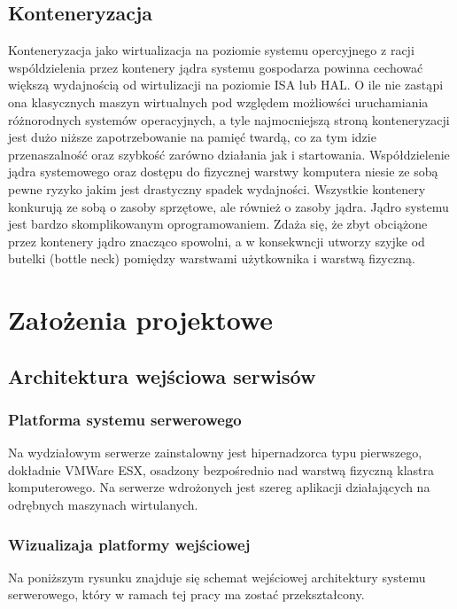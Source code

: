 \documentclass[polish, a4paper, 12pt, oneside]{book}
\begin{document}
\section{Konteneryzacja}
Konteneryzacja jako wirtualizacja na poziomie systemu opercyjnego z racji wspóldzielenia przez kontenery jądra systemu gospodarza powinna cechować większą wydajnością od wirtulizacji na poziomie ISA lub HAL. O ile nie zastąpi ona klasycznych maszyn wirtualnych pod względem możliowści uruchamiania różnorodnych systemów operacyjnych, a tyle najmocniejszą stroną konteneryzacji jest dużo niższe zapotrzebowanie na pamięć twardą, co za tym idzie przenaszalność oraz szybkość zarówno działania jak i startowania. Współdzielenie jądra systemowego oraz dostępu do fizycznej warstwy komputera niesie ze sobą pewne ryzyko jakim jest drastyczny spadek wydajności. Wszystkie kontenery konkurują ze sobą o zasoby sprzętowe, ale również o zasoby jądra. Jądro systemu jest bardzo skomplikowanym oprogramowaniem. Zdaża się, że zbyt obciążone przez kontenery jądro znacząco spowolni, a w konsekwncji utworzy szyjke od butelki (bottle neck) pomiędzy warstwami użytkownika i warstwą fizyczną.   


\chapter{Założenia projektowe}
\section{Architektura wejściowa serwisów}
\subsection{Platforma systemu serwerowego}
Na wydziałowym serwerze zainstalowny jest hipernadzorca typu pierwszego, dokładnie VMWare ESX, osadzony bezpośrednio nad warstwą fizyczną klastra komputerowego. Na serwerze wdrożonych jest szereg aplikacji działających na odrębnych maszynach wirtulanych. 

\subsection {Wizualizaja platformy wejściowej} Na poniższym rysunku znajduje się schemat wejściowej architektury systemu serwerowego, który w ramach tej pracy ma zostać przekształcony.
\end{document}
